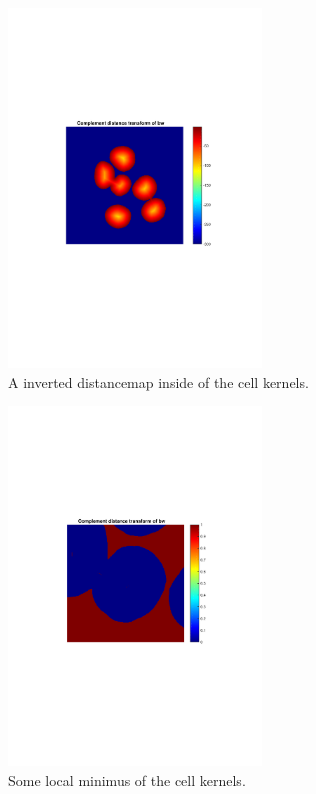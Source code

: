 \documentclass[10pt,twocolumn]{article}
\begin{document}
\begin{figure}[ht]
\centering
\includegraphics[width=0.6\textwidth]{Bilder/InvertedDistanceMap.pdf}
\caption{A inverted distancemap inside of the cell kernels.}
\label{fig:CellKernelsDistInv}
\end{figure}

\begin{figure}[ht]
\centering
\includegraphics[width=0.6\textwidth]{Bilder/MinimumValusZoomedIn.pdf}
\caption{Some local minimus of the cell kernels.}
\label{fig:CellKernelsMinimum}
\end{figure}
\end{document}
